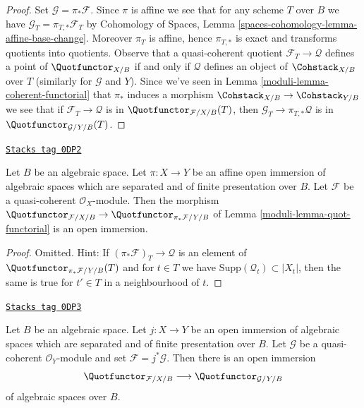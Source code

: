 \begin{proof}

Set $\mathcal{G} = \pi_*\mathcal{F}$. Since $\pi$ is affine we see that for
any scheme $T$ over $B$ we have $\mathcal{G}_T = \pi_{T, *}\mathcal{F}_T$ by
Cohomology of Spaces, Lemma \ref{spaces-cohomology-lemma-affine-base-change}.
Moreover $\pi_T$ is affine, hence $\pi_{T, *}$ is exact and transforms
quotients into quotients. Observe that a quasi-coherent quotient
$\mathcal{F}_T \to \mathcal{Q}$ defines a point of $\Quotfunctor_{X/B}$
if and only if $\mathcal{Q}$ defines an object of $\Cohstack_{X/B}$
over $T$ (similarly for $\mathcal{G}$ and $Y$). Since we've seen in
Lemma \ref{moduli-lemma-coherent-functorial}
that $\pi_*$ induces a morphism $\Cohstack_{X/B} \to \Cohstack_{Y/B}$
we see that if $\mathcal{F}_T \to \mathcal{Q}$ is in
$\Quotfunctor_{\mathcal{F}/X/B}(T)$, then
$\mathcal{G}_T \to \pi_{T, *}\mathcal{Q}$ is
in $\Quotfunctor_{\mathcal{G}/Y/B}(T)$.
\end{proof}

\begin{lemma}
\label{moduli-lemma-quot-open}
\href{https://stacks.math.columbia.edu/tag/0DP2}{\texttt{Stacks tag 0DP2}}

Let $B$ be an algebraic space. Let $\pi : X \to Y$ be an affine open immersion
of algebraic spaces which are separated and of finite presentation over $B$.
Let $\mathcal{F}$ be a quasi-coherent $\mathcal{O}_X$-module. Then the morphism
$\Quotfunctor_{\mathcal{F}/X/B} \to \Quotfunctor_{\pi_*\mathcal{F}/Y/B}$ of
Lemma \ref{moduli-lemma-quot-functorial} is an open immersion.
\end{lemma}

\begin{proof}
Omitted. Hint: If $(\pi_*\mathcal{F})_T \to \mathcal{Q}$ is an element of
$\Quotfunctor_{\pi_*\mathcal{F}/Y/B}(T)$
and for $t \in T$ we have $\text{Supp}(\mathcal{Q}_t) \subset |X_t|$,
then the same is true for $t' \in T$ in a neighbourhood of $t$.
\end{proof}

\begin{lemma}
\label{moduli-lemma-quot-better-open}
\href{https://stacks.math.columbia.edu/tag/0DP3}{\texttt{Stacks tag 0DP3}}

Let $B$ be an algebraic space. Let $j : X \to Y$ be an open immersion
of algebraic spaces which are separated and of finite presentation over $B$.
Let $\mathcal{G}$ be a quasi-coherent $\mathcal{O}_Y$-module and set
$\mathcal{F} = j^*\mathcal{G}$. Then there is an open immersion
$$
\Quotfunctor_{\mathcal{F}/X/B}
\longrightarrow
\Quotfunctor_{\mathcal{G}/Y/B}
$$
of algebraic spaces over $B$.
\end{lemma}

